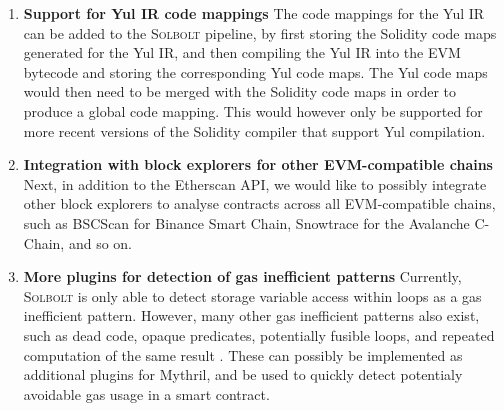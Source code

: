 \begin{enumerate}
  \item \textbf{Support for Yul IR code mappings} The code mappings for the Yul IR can be added to the
  \textcolor{NavyBlue}{\textsc{Solbolt}} pipeline, by first storing the Solidity code maps generated for the Yul IR, and then compiling
  the Yul IR into the EVM bytecode and storing the corresponding Yul code maps. The Yul code maps would then
  need to be merged with the Solidity code maps in order to produce a global code mapping. This would however
  only be supported for more recent versions of the Solidity compiler that support Yul compilation.
    
  \item \textbf{Integration with block explorers for other EVM-compatible chains} Next, in addition to 
  the Etherscan API, we would like to possibly integrate other block explorers
  to analyse contracts across all EVM-compatible chains, such as BSCScan for Binance Smart Chain,
  Snowtrace for the Avalanche C-Chain, and so on.

  \item \textbf{More plugins for detection of gas inefficient patterns} Currently, \textcolor{NavyBlue}{\textsc{Solbolt}} is only able to
  detect storage variable access within loops as a gas inefficient pattern. However, many other gas inefficient
  patterns also exist, such as dead code, opaque predicates, potentially fusible loops, and repeated
  computation of the same result \cite{gaschecker} \cite{designpatternsforgasoptimisation}. These can
  possibly be implemented as additional plugins for Mythril, and be used to quickly detect potentialy avoidable
  gas usage in a smart contract.

\end{enumerate}